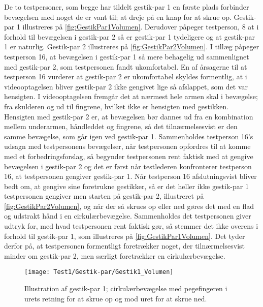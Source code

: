 De to testpersoner, som begge har tildelt gestik-par 1 en første plads forbinder bevægelsen med noget de er vant til; at dreje på en knap for at skrue op. Gestik-par 1 illustreres på \autoref{fig:GestikPar1Volumen}. Derudover påpeger testperson, 8 at i forhold til bevægelsen i gestik-par 2 så er gestik-par 1 tydeligere og at gestik-par 1 er naturlig. Gestik-par 2 illustreres på \autoref{fig:GestikPar2Volumen}. I tillæg påpeger testperson 16, at bevægelsen i gestik-par 1 så mere behagelig ud sammenlignet med gestik-par 2, som testpersonen fandt ukomfortabel. En af årsagerne til at testperson 16 vurderer at gestik-par 2 er ukomfortabel skyldes formentlig, at i videooptagelsen bliver gestik-par 2 ikke gengivet lige så afslappet, som det var hensigten. I videooptagelsen fremgår det at nærmest hele armen skal i bevægelse; fra skulderen og ud til fingrene, hvilket ikke er hensigten med gestikken. Hensigten med gestik-par 2 er, at bevægelsen bør dannes ud fra en kombination mellem underarmen, håndleddet og fingrene, så det tilnærmelsesvist er den samme bevægelse, som går igen ved gestik-par 1. Sammenholdes testperson 16’s udsagn med testpersonens bevægelser, når testpersonen opfordres til at komme med et forbedringsforslag, så begynder testpersonen rent faktisk med at gengive bevægelsen i gestik-par 2 og det er først når testlederen konfronterer testperson 16, at testpersonen gengiver gestik-par 1. Når testperson 16 afslutningsvist bliver bedt om, at gengive sine foretrukne gestikker, så er det heller ikke gestik-par 1 testpersonen gengiver men starten på gestik-par 2, illustreret på \autoref{fig:GestikPar2Volumen}, og når der så skrues op eller ned gøres det med en flad og udstrakt hånd i en cirkulærbevægelse. Sammenholdes det testpersonen giver udtryk for, med hvad testpersonen rent faktisk gør, så stemmer det ikke overens i forhold til gestik-par 1, som illustreres på \autoref{fig:GestikPar1Volumen}. Det tyder derfor på, at testpersonen formentligt foretrækker noget, der tilnærmelsesvist minder om gestik-par 2, men særligt foretrækker en cirkulærbevægelse.
%
\begin{figure}[H]
	\centering
	\texttt{[image: Test1/Gestik-par/Gestik1\_Volumen]}
	\caption{Illustration af gestik-par 1; cirkulærbevægelse med pegefingeren i urets retning for at skrue op og mod uret for at skrue ned.}
	\label{fig:GestikPar1Volumen}
\end{figure}
\noindent
%
